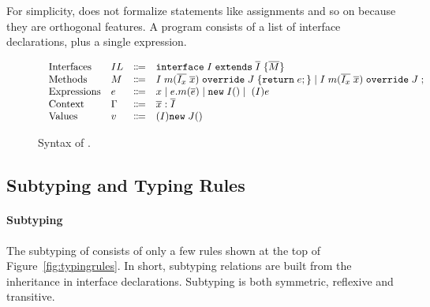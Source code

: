 For simplicity, \name{} does not formalize statements like assignments and so on because they are orthogonal features.
A program consists of a list of interface declarations, plus a single expression.

\begin{figure*}[t]
\saveSpaceFig
\begin{displaymath}
\begin{array}{l}
\begin{array}{llrl}
\text{Interfaces}   & IL & \Coloneqq & \texttt{interface} \; I \; \texttt{extends} \; \overline{I} \; {\{} \overline{M} {\}} \\
\text{Methods}      & M  & \Coloneqq & I \; m (\overline{I_x} \; \overline{x}) \; \texttt{override} \; J \; {\{} \texttt{return} \; e ; {\}}  \mid
									   I \; m (\overline{I_x} \; \overline{x}) \; \texttt{override} \; J \; ; \\
\text{Expressions}  & e  & \Coloneqq & x \mid
e.m(\overline{e}) \mid
\texttt{new} \; I() \mid \; (I)e \\
\text{Context}      & \Gamma & \Coloneqq & \overline{x}:\overline{I} \\
\text{Values}       & v & \Coloneqq & (I) \texttt{new} \; J() \\
\end{array}
\end{array}
\end{displaymath}
\caption{Syntax of \name{}.}\label{fig:syntax}
\saveSpaceFig
\end{figure*}

\subsection{Subtyping and Typing Rules}
\paragraph{Subtyping}
The subtyping of \MIM{} consists of only a few rules shown at the top of Figure~\ref{fig:typingrules}.
In short, subtyping relations are built from the inheritance in interface
declarations. Subtyping is both symmetric, reflexive and transitive.

